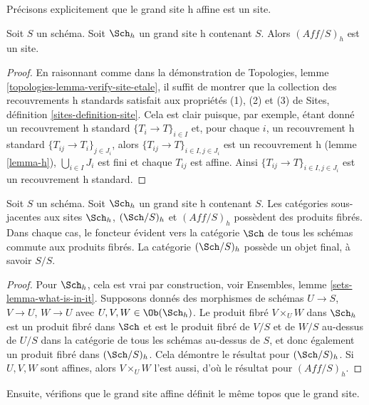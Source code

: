 \noindent
Précisons explicitement que le grand site h affine est un site.

\begin{lemma}
\label{lemma-verify-site-h}
Soit $S$ un schéma. Soit $\Sch_h$ un grand
site h contenant $S$. Alors $(\textit{Aff}/S)_h$ est un site.
\end{lemma}

\begin{proof}
En raisonnant comme dans la démonstration de\newline
Topologies, lemme \ref{topologies-lemma-verify-site-etale},
il suffit de montrer que la collection des recouvrements h standards
satisfait aux propriétés (1), (2) et (3) de
Sites, définition \ref{sites-definition-site}.
Cela est clair puisque, par exemple, étant donné un recouvrement h standard
$\{T_i \to T\}_{i\in I}$ et, pour chaque
$i$, un recouvrement h standard $\{T_{ij} \to T_i\}_{j \in J_i}$, alors
$\{T_{ij} \to T\}_{i \in I, j\in J_i}$ est un recouvrement h
(lemme \ref{lemma-h}), $\bigcup_{i\in I} J_i$ est fini et
chaque $T_{ij}$ est affine. Ainsi $\{T_{ij} \to T\}_{i \in I, j\in J_i}$
est un recouvrement h standard.
\end{proof}

\begin{lemma}
\label{lemma-fibre-products-h}
Soit $S$ un schéma. Soit $\Sch_h$ un grand
site h contenant $S$. Les catégories sous-jacentes aux sites
$\Sch_h$, $(\Sch/S)_h$ et $(\textit{Aff}/S)_h$ possèdent des produits fibrés.
Dans chaque cas, le foncteur évident vers la catégorie $\Sch$ de
tous les schémas commute aux produits fibrés. La catégorie
$(\Sch/S)_h$ possède un objet final, à savoir $S/S$.
\end{lemma}

\begin{proof}
Pour $\Sch_h$, cela est vrai par construction, voir
Ensembles, lemme \ref{sets-lemma-what-is-in-it}.
Supposons donnés des morphismes de schémas $U \to S$, $V \to U$, $W \to U$
avec $U, V, W \in \Ob(\Sch_h)$.
Le produit fibré $V \times_U W$ dans $\Sch_h$
est un produit fibré dans $\Sch$ et
est le produit fibré de $V/S$ et de $W/S$ au-dessus de $U/S$ dans
la catégorie de tous les schémas au-dessus de $S$, et donc également un
produit fibré dans $(\Sch/S)_h$.
Cela démontre le résultat pour $(\Sch/S)_h$.
Si $U, V, W$ sont affines, alors $V \times_U W$ l'est aussi, d'où le
résultat pour $(\textit{Aff}/S)_h$.
\end{proof}

\noindent
Ensuite, vérifions que le grand site affine définit le même
topos que le grand site.

